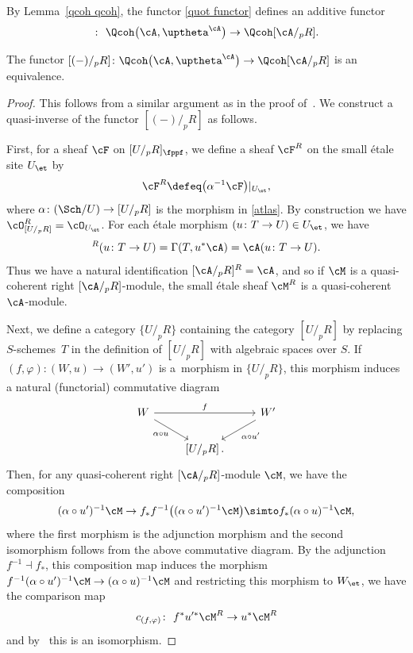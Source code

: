 By Lemma~\ref{qcoh qcoh}, the functor \eqref{quot functor} defines an additive functor
\begin{gather*}
[(-)/_pR]\colon\ \Qcoh\big(\cA,\uptheta^{\cA}\big)\to \Qcoh[\cA/_pR].
\end{gather*}
\begin{prop}\label{quot equiv}
The functor $[(-)/_pR]\colon \Qcoh\big(\cA,\uptheta^{\cA}\big)\to \Qcoh[\cA/_pR]$ is an equivalence.
\begin{proof}
This follows from a similar argument as in the proof of~\cite[Proposition~13.1; 06WT]{stacks}. We construct a quasi-inverse
of the functor $[(-)/_pR]$ as follows.

First, for a sheaf $\cF$ on $[U/_pR]_{\fppf}$, we define a sheaf $\cF^R$ on the small \'etale site $U_{\et}$ by
\begin{gather*}
\cF^R\defeq\big(\alpha^{-1}\cF\big)|_{U_{\et}},
\end{gather*}
where $\alpha\colon (\Sch/U)\to [U/_pR]$ is the morphism in \eqref{atlas}. By construction we have $\cO_{[U/_pR]}^R=\cO_{U_{\et}}$. For each \'etale morphism $(u\colon T\to U)\in U_{\et}$, we have
\begin{gather*}
[\cA/_pR]^R(u\colon T\to U)=\Gamma(T,u^*\cA)=\cA(u\colon T\to U).
\end{gather*}
 Thus we have a natural identification $[\cA/_pR]^R=\cA$, and so if $\cM$ is a quasi-coherent right $[\cA/_pR]$-module, the small \'etale sheaf $\cM^R$ is a quasi-coherent $\cA$-module.

Next, we define a category $\{ U/_pR\}$ containing the category $[U/_pR]$ by replacing $S$-sche\-mes~$T$ in the definition of $[U/_pR]$ with algebraic spaces over $S$. If $(f,\varphi)\colon (W,u)\to(W',u')$ is a~morphism in $\{U/_pR\}$, this morphism induces a natural (functorial) commutative diagram
\[
\begin{tikzcd}
W \arrow[rr,"f"]\arrow[rd,"\alpha\circ u"']&&W'\arrow[ld," \alpha\circ u'"]\\
&\left[U/_pR\right].&
\end{tikzcd}
\]
Then, for any quasi-coherent right $[\cA/_pR]$-module $\cM$, we have the composition
\begin{gather*}
(\alpha\circ u')^{-1}\cM\to f_*f^{-1}\big((\alpha\circ u')^{-1}\cM\big)\simto f_*(\alpha\circ u)^{-1}\cM,
\end{gather*}
where the first morphism is the adjunction morphism and the second isomorphism follows from the above commutative diagram. By the adjunction $f^{-1}\dashv f_*$, this composition map induces the morphism
$f^{-1}(\alpha\circ u')^{-1}\cM\to (\alpha\circ u)^{-1}\cM$
and restricting this morphism to $W_{\et}$, we have the comparison map
\begin{gather*}
c_{(f,\varphi)}\colon\ f^*u'^*\cM^R\to u^*\cM^R
\end{gather*}
and by~\cite[Lemma~11.6; 06WK]{stacks} this is an isomorphism.


\end{proof}
\end{prop}
